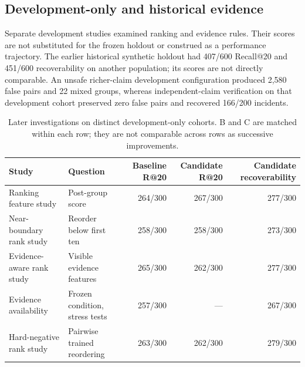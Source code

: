 \subsection{Development-only and historical evidence}
Separate development studies examined ranking and evidence rules. Their scores are not substituted for the frozen holdout or construed as a performance trajectory. The earlier historical synthetic holdout had 407/600 Recall@20 and 451/600 recoverability on another population; its scores are not directly comparable. An unsafe richer-claim development configuration produced 2,580 false pairs and 22 mixed groups, whereas independent-claim verification on that development cohort preserved zero false pairs and recovered 166/200 incidents.
\begin{table}[t]\centering\footnotesize\caption{Later investigations on distinct development-only cohorts. B and C are matched within each row; they are not comparable across rows as successive improvements.}\label{tab:development}\begin{tabularx}{\textwidth}{@{}p{}Yrrr@{}}\toprule Study & Question & Baseline R@20 & Candidate R@20 & Candidate recoverability\\\midrule Ranking feature study & Post-group score & 264/300 & 267/300 & 277/300\\ Near-boundary rank study & Reorder below first ten & 258/300 & 258/300 & 273/300\\ Evidence-aware rank study & Visible evidence features & 265/300 & 262/300 & 277/300\\ Evidence availability & Frozen condition, stress tests & 257/300 & --- & 267/300\\ Hard-negative rank study & Pairwise trained reordering & 263/300 & 262/300 & 279/300\\\bottomrule\end{tabularx}\end{table}
